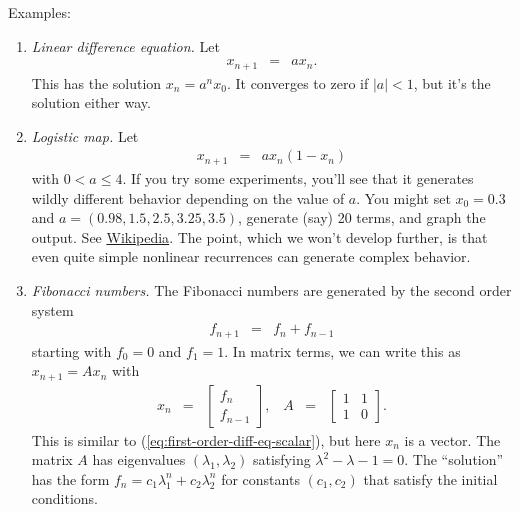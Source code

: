 \documentclass[11pt]{article}
\begin{document}
Examples:
\begin{enumerate}
\item {\it Linear difference equation.\/}
Let
\begin{eqnarray}
    x_{n+1} &=& a x_n .
    \label{eq:first-order-diff-eq-scalar}
\end{eqnarray}
This has the solution $ x_n = a^n x_0$.
It converges to zero if $ |a | < 1 $, but it's the solution either way.

\item {\it Logistic map.\/}
Let
\begin{eqnarray*}
    x_{n+1} &=& a x_n (1-x_n)
\end{eqnarray*}
with $ 0 < a \leq 4$.
If you try some experiments, you'll see that it generates wildly
different behavior depending on the value of $a$.
You might set $x_0 = 0.3$ and $a = (0.98, 1.5, 2.5, 3.25, 3.5 )$,
generate (say) 20 terms, and graph the output.
See
\href{http://en.wikipedia.org/wiki/Logistic_map}{Wikipedia}.
The point, which we won't develop further, is that even
quite simple nonlinear recurrences can generate complex behavior.

\item {\it Fibonacci numbers.\/}
The Fibonacci numbers are generated by the second order system
\begin{eqnarray*}
    f_{n+1} &=& f_n + f_{n-1}
\end{eqnarray*}
starting with $f_0 = 0$ and $f_1 = 1$.
In matrix terms, we can write this as $ x_{n+1} = A x_n $ with
\begin{eqnarray*}
        x_n &=& \left[ \begin{array}{c} f_n \\ f_{n-1} \end{array}\right],
        \;\;\;
        A \;\;=\;\; \left[ \begin{array}{cc} 1 & 1  \\ 1 & 0 \end{array}\right] .
\end{eqnarray*}
This is similar to (\ref{eq:first-order-diff-eq-scalar}), but here $x_n$ is a vector.
The matrix $A$ has eigenvalues $(\lambda_1,\lambda_2)$ satisfying
$ \lambda^2 - \lambda - 1 = 0 $.
The ``solution'' has the form $ f_n = c_1 \lambda_1^n + c_2 \lambda_2^n $ for constants
$(c_1,c_2)$ that satisfy the initial conditions.


\end{enumerate}
\end{document}
